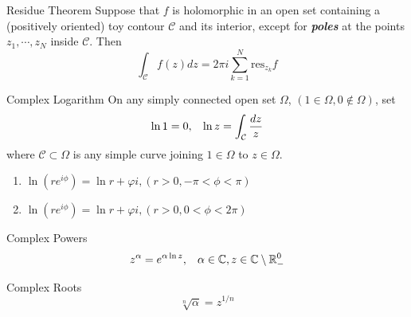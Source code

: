 \documentclass{beamer}
\begin{document}
\begin{frame}
\begin{block}{Residue Theorem}
Suppose that $f$ is holomorphic in an open set containing a (positively oriented) toy contour $\mathcal{C}$ and its interior, except for \textcolor[rgb]{0,0.6,0.3}{\textit{\textbf{poles}}} at the points $z_1,\cdots,z_N$ inside $\mathcal{C}$. Then
$$\int_{\mathcal{C}}f(z)dz=2\pi i\sum\limits_{k=1}^N\text{res}_{z_k}f$$
\end{block}


\end{frame}

\begin{frame}
\begin{block}{Complex Logarithm}
On any simply connected open set $\Omega$, $(1\in\Omega,0\notin\Omega)$, set
$$\ln 1=0,\hspace{3mm}\ln z=\int_{\mathcal{C}}\dfrac{dz}{z}$$
where $\mathcal{C}\subset\Omega$ is any simple curve joining $1\in\Omega$ to $z\in\Omega$.
\begin{enumerate}
\item $\ln(re^{i\phi})=\ln r+\varphi i, (r>0,-\pi<\phi<\pi)$
\item $\ln(re^{i\phi})=\ln r+\varphi i, (r>0,0<\phi<2\pi)$
\end{enumerate}
\end{block}
\begin{block}{Complex Powers}
$$z^{\alpha}=e^{\alpha\ln z},\hspace{3mm}\alpha\in\mathbb{C},z\in\mathbb{C}\setminus\mathbb{R}_-^0$$
\end{block}
\begin{block}{Complex Roots}
$$\sqrt[n]{\alpha}=z^{1/n}$$
\end{block}
\end{frame}
\end{document}
